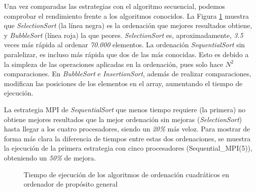 
Una vez comparadas las estrategias con el algoritmo secuencial, podemos comprobar el rendimiento frente a los algoritmos conocidos. La Figura \ref{fig:ordenaciones_cuadraticas} muestra que \textit{SelectionSort} (la línea negra) es la ordenación que mejores resultados obtiene, y \textit{BubbleSort} (línea roja) la que peores. \textit{SelectionSort} es, aproximadamente, \textit{3.5} veces más rápida al ordenar \textit{70.000} elementos. La ordenación \textit{SequentialSort} sin paralelizar, es incluso más rápida que dos de las más conocidas. Esto es debido a la simpleza de las operaciones aplicadas en la ordenación, pues solo hace \(N^{2}\) comparaciones. En \textit{BubbleSort} e \textit{InsertionSort}, además de realizar comparaciones, modifican las posiciones de los elementos en el array, aumentando el tiempo de ejecución.

La estrategia MPI de \textit{SequentialSort} que menos tiempo requiere (la primera) no obtiene mejores resultados que la mejor ordenación sin mejoras (\textit{SelectionSort}) hasta llegar a los cuatro procesadores, siendo un \textit{20\%} más veloz. Para mostrar de forma más clara la diferencia de tiempos entre estas dos ordenaciones, se muestra la ejecución de la primera estrategia con cinco procesadores (Sequential\_MPI(5)), obteniendo un \textit{50\%} de mejora.


\begin{figure}[!h]
	\centering
	\caption{Tiempo de ejecución de los algoritmos de ordenación cuadráticos en ordenador de propósito general}
	\label{fig:ordenaciones_cuadraticas}
\end{figure}


